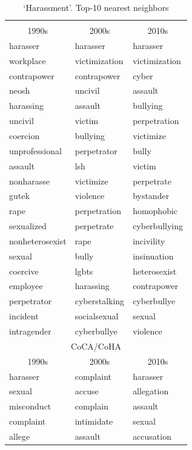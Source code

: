 \documentclass[output=paper]{langsci/langscibook}
\begin{document}
\begin{table}
\footnotesize
\caption{`Harassment'. Top-10 nearest neighbors\label{tab:harassment-nns}}
 \begin{tabular}{lll}
  \lsptoprule
  \multicolumn{3}{c}{Psychology}\\
 \multicolumn{1}{c}{1990s}  & \multicolumn{1}{c}{2000s} & \multicolumn{1}{c}{2010s}\\
  \midrule
harasser&harasser&harasser           \\ 
workplace&victimization&victimization\\ 
contrapower&contrapower&cyber        \\ 
neosh&uncivil&assault                \\ 
harassing&assault&bullying           \\ 
uncivil&victim&perpetration          \\ 
coercion&bullying&victimize          \\ 
unprofessional&perpetrator&bully     \\ 
assault&lsh&victim                   \\ 
nonharasse&victimize&perpetrate      \\ 
gutek&violence&bystander             \\ 
rape&perpetration&homophobic         \\ 
sexualized&perpetrate&cyberbullying  \\ 
nonheterosexist&rape&incivility      \\ 
sexual&bully&insinuation             \\ 
coercive&lgbts&heterosexist          \\ 
employee&harassing&contrapower       \\ 
perpetrator&cyberstalking&cyberbullye\\ 
incident&socialsexual&sexual         \\ 
intragender&cyberbullye&violence     \\\midrule
\multicolumn{3}{c}{CoCA/CoHA}\\
\multicolumn{1}{c}{1990s}  & \multicolumn{1}{c}{2000s} & \multicolumn{1}{c}{2010s}\\\midrule
harasser&complaint&harasser\\
sexual&accuse&allegation\\
misconduct&complain&assault\\
complaint&intimidate&sexual\\
allege&assault&accusation\\

\end{tabular}
\end{table}
\end{document}
